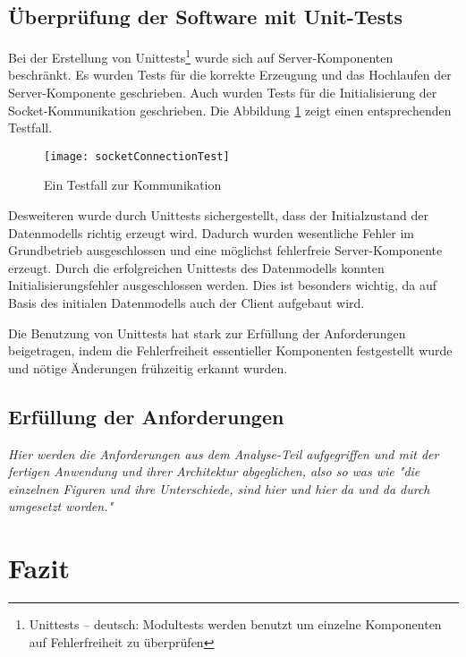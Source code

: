 \subsection{Überprüfung der Software mit Unit-Tests}
\label{subsec:unittests}

Bei der Erstellung von Unittests\footnote{Unittests -- deutsch: Modultests werden benutzt um einzelne Komponenten auf Fehlerfreiheit zu überprüfen} wurde sich auf Server-Komponenten beschränkt. Es wurden Tests für die korrekte Erzeugung und das Hochlaufen der Server-Komponente geschrieben. Auch wurden Tests für die Initialisierung der Socket-Kommunikation geschrieben. Die Abbildung \ref{fig:ComTest} zeigt einen entsprechenden Testfall.

\begin{figure}[htp]
	\centering
	\captionsetup{justification=centering}
	\texttt{[image: socketConnectionTest]}
	\caption[Socket-Test]{Ein Testfall zur Kommunikation}
	\label{fig:ComTest}
\end{figure}

\noindent Desweiteren wurde durch Unittests sichergestellt, dass der Initialzustand der Datenmodells richtig erzeugt wird. Dadurch wurden wesentliche Fehler im Grundbetrieb ausgeschlossen und eine möglichst fehlerfreie Server-Komponente erzeugt. Durch die erfolgreichen Unittests des Datenmodells konnten Initialisierungsfehler ausgeschlossen werden. Dies ist besonders wichtig, da auf Basis des initialen Datenmodells auch der Client aufgebaut wird.

Die Benutzung von Unittests hat stark zur Erfüllung der Anforderungen beigetragen, indem die Fehlerfreiheit essentieller Komponenten festgestellt wurde und nötige Änderungen frühzeitig erkannt wurden.

\subsection{Erfüllung der Anforderungen}
\label{subsec:erfullung_anforderungen}

\emph{Hier werden die Anforderungen aus dem Analyse-Teil aufgegriffen und mit der fertigen Anwendung und ihrer Architektur abgeglichen, also so was wie "die einzelnen Figuren und ihre Unterschiede, sind hier und hier da und da durch umgesetzt worden."}

\section{Fazit}
\label{sec:Fazit}